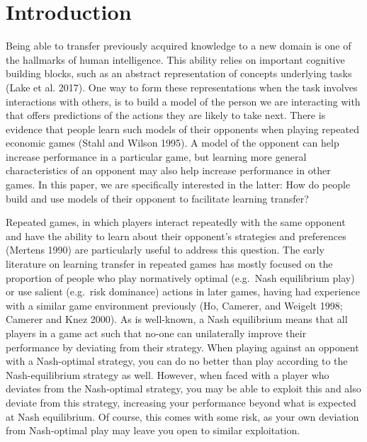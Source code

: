 \documentclass[smallextended]{svjour3}       %
\begin{document}
\def\spacingset#1{\renewcommand{\baselinestretch}%
{#1}\small\normalsize} \spacingset{1}


\hypertarget{introduction}{%
\section{Introduction}\label{introduction}}

Being able to transfer previously acquired knowledge to a new domain is
one of the hallmarks of human intelligence. This ability relies on
important cognitive building blocks, such as an abstract representation
of concepts underlying tasks (Lake et al. 2017). One way to form these
representations when the task involves interactions with others, is to
build a model of the person we are interacting with that offers
predictions of the actions they are likely to take next. There is
evidence that people learn such models of their opponents when playing
repeated economic games (Stahl and Wilson 1995). A model of the opponent
can help increase performance in a particular game, but learning more
general characteristics of an opponent may also help increase
performance in other games. In this paper, we are specifically
interested in the latter: How do people build and use models of their
opponent to facilitate learning transfer?

Repeated games, in which players interact repeatedly with the same
opponent and have the ability to learn about their opponent's strategies
and preferences (Mertens 1990) are particularly useful to address this
question. The early literature on learning transfer in repeated games
has mostly focused on the proportion of people who play normatively
optimal (e.g.~Nash equilibrium play) or use salient (e.g.~risk
dominance) actions in later games, having had experience with a similar
game environment previously (Ho, Camerer, and Weigelt 1998; Camerer and
Knez 2000). As is well-known, a Nash equilibrium means that all players
in a game act such that no-one can unilaterally improve their
performance by deviating from their strategy. When playing against an
opponent with a Nash-optimal strategy, you can do no better than play
according to the Nash-equilibrium strategy as well. However, when faced
with a player who deviates from the Nash-optimal strategy, you may be
able to exploit this and also deviate from this strategy, increasing
your performance beyond what is expected at Nash equilibrium. Of course,
this comes with some risk, as your own deviation from Nash-optimal play
may leave you open to similar exploitation.
\end{document}
